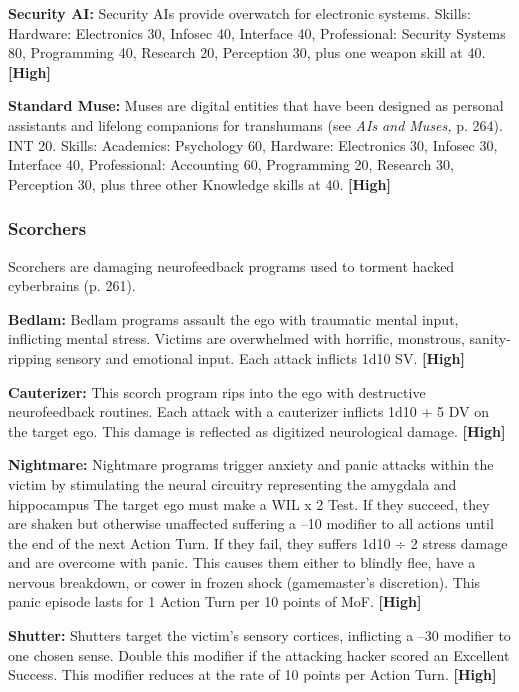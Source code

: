 \textbf{Security AI:} Security AIs provide overwatch for 
electronic systems. Skills: Hardware: Electronics 30, 
Infosec 40, Interface 40, Professional: Security Systems
80, Programming 40, Research 20, Perception
30, plus one weapon skill at 40. \textbf{[High]}

\textbf{Standard Muse:} Muses are digital entities that have 
been designed as personal assistants and lifelong 
companions for transhumans (see \textit{AIs and Muses,}
p. 264). INT 20. Skills: Academics: Psychology 60, 
Hardware: Electronics 30, Infosec 30, Interface 40, 
Professional: Accounting 60, Programming 20, Research
30, Perception 30, plus three other Knowledge
skills at 40. \textbf{[High]}

\subsubsection{Scorchers}

Scorchers are damaging neurofeedback programs used 
to torment hacked cyberbrains (p. 261).

\textbf{Bedlam:} Bedlam programs assault the ego with 
traumatic mental input, inflicting mental stress. 
Victims are overwhelmed with horrific,  monstrous, 
sanity-ripping sensory and emotional input. Each 
attack inflicts 1d10 SV. \textbf{[High]}

\textbf{Cauterizer:} This scorch program rips into the ego 
with destructive neurofeedback routines. Each attack 
with a cauterizer inflicts 1d10 + 5 DV on the target 
ego. This damage is reflected as digitized neurological
damage. \textbf{[High]}

\textbf{Nightmare:} Nightmare programs trigger anxiety 
and panic attacks within the victim by stimulating the 
neural circuitry representing the amygdala and hippocampus
The target ego must make a WIL x 2 Test.
If they succeed, they are shaken but otherwise unaffected
suffering a –10 modifier to all actions until the
end of the next Action Turn. If they fail, they suffers 
1d10 ÷ 2 stress damage and are overcome with panic. 
This causes them either to blindly flee, have a nervous 
breakdown, or cower in frozen shock (gamemaster's 
discretion). This panic episode lasts for 1 Action Turn 
per 10 points of MoF. \textbf{[High]}

\textbf{Shutter:} Shutters target the victim's sensory cortices, 
inflicting a –30 modifier to one chosen sense. Double 
this modifier if the attacking hacker scored an Excellent
Success. This modifier reduces at the rate of 10
points per Action Turn. \textbf{[High]}

